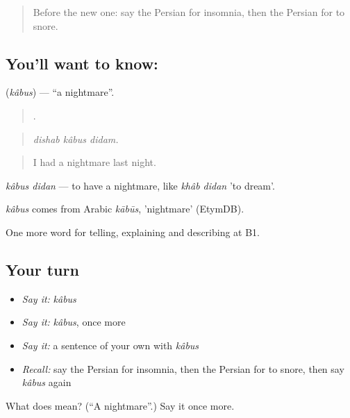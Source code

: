 \label{lesson:FA-C499-kabus}



\begin{quote}
Before the new one: say the Persian for insomnia, then the Persian for to snore.
\end{quote}

\subsection*{You'll want to know: }
\textbf{} (\emph{kâbus}) — \textquotedblleft{}a nightmare\textquotedblright{}.

\begin{quote}
  .
\end{quote}

\begin{quote}
\emph{dishab kâbus didam.}
\end{quote}

\begin{quote}
I had a nightmare last night.
\end{quote}

\emph{kâbus didan} — to have a nightmare, like \emph{khâb didan} 'to dream'.

\begin{cousinweb}
\emph{kâbus} comes from Arabic \emph{kābūs}, 'nightmare' (EtymDB).
\end{cousinweb}

\begin{grammarlens}[title={What you've built}]
One more word for telling, explaining and describing at B1.
\end{grammarlens}

\subsection*{Your turn}
\begin{itemize}
\raggedright
  \item \emph{Say it:} \emph{kâbus}
  \item \emph{Say it:} \emph{kâbus}, once more
  \item \emph{Say it:} a sentence of your own with \emph{kâbus}
  \item \emph{Recall:} say the Persian for insomnia, then the Persian for to snore, then say \emph{kâbus} again
\end{itemize}

\begin{tcolorbox}[breakable,colback=teal!4,colframe=teal!35!black,title={Before you move on}]
What does  mean? (\textquotedblleft{}A nightmare\textquotedblright{}.) Say it once more.
\end{tcolorbox}
